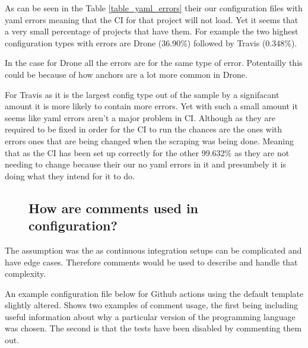 \documentclass[twoside,12pt,titlepage,a4paper]{article}
\begin{document}


As can be seen in the Table \ref{table_yaml_errors} their our configuration files with yaml errors meaning that the CI for that project will not load. Yet it seems that a very small percentage of projects that have them. For example the two highest configuration types with errors are Drone (36.90\%) followed by Travis (0.348\%).

In the case for Drone all the errors are for the same type of error. Potentailly this could be because of how anchors are a lot more common in Drone.

For Travis as it is the largest config type out of the sample by a signifacant amount it is more likely to contain more errors. Yet with such a small amount it seems like yaml errors aren't a major problem in CI. Although as they are required to be fixed in order for the CI to run the chances are the ones with errors ones that are being changed when the scraping was being done. Meaning that as the CI has been set up correctly for the other 99.632\% as they are not needing to change because their our no yaml errors in it and presumbely it is doing what they intend for it to do.


\pagebreak

\begin{figure}[!ht]
  \vspace*{-0.05in}
  \subsection{How are comments used in configuration?}
  \vspace*{-0.05in}
\end{figure}


The assumption was the as continuous integration setups can be complicated and have edge cases. Therefore comments would be used to describe and handle that complexity.

An example configuration file below for Github actions using the default template slightly altered. Shows two examples of comment usage, the first being including useful information about why a particular version of the programming language was chosen. The second is that the tests have been disabled by commenting them out. 
\end{document}
